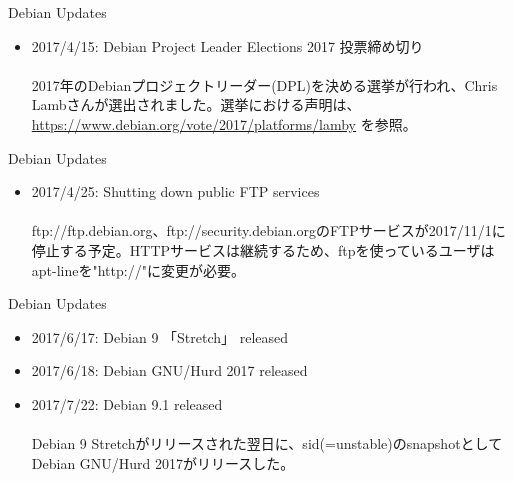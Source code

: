 \begin{frame}{Debian Updates}%

\begin{itemize}[<+->]
\item 2017/4/15:  Debian Project Leader Elections 2017 投票締め切り\\
\ \\
   \small{2017年のDebianプロジェクトリーダー(DPL)を決める選挙が行われ、Chris Lambさんが選出されました。選挙における声明は、\url{https://www.debian.org/vote/2017/platforms/lamby} を参照。}

\end{itemize}

\end{frame}


\begin{frame}{Debian Updates}%

\begin{itemize}[<+->]
\item 2017/4/25:  Shutting down public FTP services\\
\ \\
\small{ftp://ftp.debian.org、ftp://security.debian.orgのFTPサービスが2017/11/1に停止する予定。HTTPサービスは継続するため、ftpを使っているユーザはapt-lineを"http://"に変更が必要。}

\end{itemize}

\end{frame}


\begin{frame}{Debian Updates}%

\begin{itemize}[<+->]
\item 2017/6/17:  Debian 9 「Stretch」 released\\
\item 2017/6/18:  Debian GNU/Hurd 2017 released\\
\item 2017/7/22:  Debian 9.1 released\\
\ \\
  \small{Debian 9 Stretchがリリースされた翌日に、sid(=unstable)のsnapshotとしてDebian GNU/Hurd 2017がリリースした。}

\end{itemize}

\end{frame}


